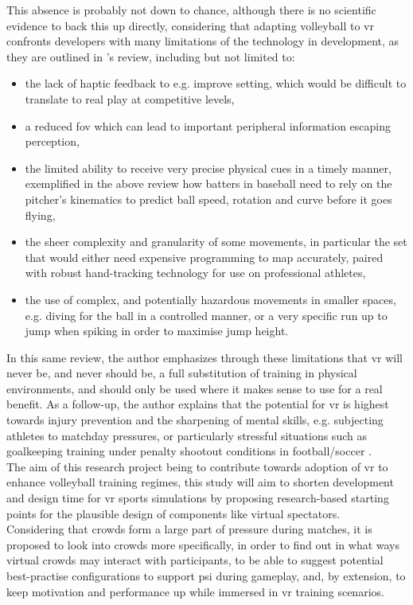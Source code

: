 This absence is probably not down to chance, although there is no scientific evidence to back this up directly, considering that adapting volleyball to \gls{vr} confronts developers with many limitations of the technology in development, as they are outlined in \cite{gerwann-2025-immersive}'s review, including but not limited to:
\begin{itemize}
	\item the lack of haptic feedback to e.g. improve setting, which would be difficult to translate to real play at competitive levels, 
	\item a reduced \gls{fov} which can lead to important peripheral information escaping perception, 
	\item the limited ability to receive very precise physical cues in a timely manner, exemplified in the above review how batters in baseball need to rely on the pitcher's kinematics to predict ball speed, rotation and curve before it goes flying, 
	\item the sheer complexity and granularity of some movements, in particular the set that would either need expensive programming to map accurately, paired with robust hand-tracking technology for use on professional athletes,
	\item the use of complex, and potentially hazardous movements in smaller spaces, e.g. diving for the ball in a controlled manner, or a very specific run up to jump when spiking in order to maximise jump height.
\end{itemize}
In this same review, the author emphasizes through these limitations that \gls{vr} will never be, and never should be, a full substitution of training in physical environments, and should only be used where it makes sense to use for a real benefit. As a follow-up, the author explains that the potential for \gls{vr} is highest towards injury prevention and the sharpening of mental skills, e.g. subjecting athletes to matchday pressures, or particularly stressful situations such as goalkeeping training under penalty shootout conditions in football/soccer \cite{gerwann-2025-immersive}.\\

The aim of this research project being to contribute towards adoption of \gls{vr} to enhance volleyball training regimes, this study will aim to shorten development and design time for \gls{vr} sports simulations by proposing research-based starting points for the plausible design of components like virtual spectators.\\
Considering that crowds form a large part of pressure during matches, it is proposed to look into crowds more specifically, in order to find out in what ways virtual crowds may interact with participants, to be able to suggest potential best-practise configurations to support \gls{psi} during gameplay, and, by extension, to keep motivation and performance up while immersed in \gls{vr} training scenarios.

